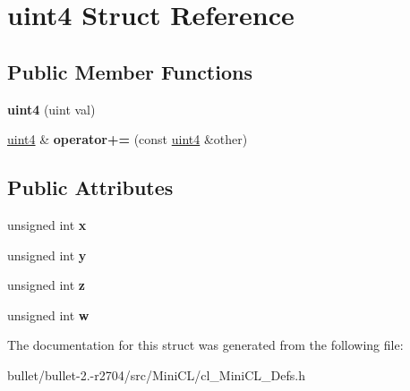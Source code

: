 \hypertarget{structuint4}{\section{uint4 Struct Reference}
\label{structuint4}
}
\subsection*{Public Member Functions}
\begin{DoxyCompactItemize}
\item 
\hypertarget{structuint4_a1804004744b3cc7230dba8c5d9082044}{{\bfseries uint4} (uint val)}\label{structuint4_a1804004744b3cc7230dba8c5d9082044}

\item 
\hypertarget{structuint4_a684ea0df820c3d948f6745d1760df90b}{\hyperlink{structuint4}{uint4} \& {\bfseries operator+=} (const \hyperlink{structuint4}{uint4} \&other)}\label{structuint4_a684ea0df820c3d948f6745d1760df90b}

\end{DoxyCompactItemize}
\subsection*{Public Attributes}
\begin{DoxyCompactItemize}
\item 
\hypertarget{structuint4_a8056d446b1dfa2c46affb607add6e552}{unsigned int {\bfseries x}}\label{structuint4_a8056d446b1dfa2c46affb607add6e552}

\item 
\hypertarget{structuint4_a06c291d608ef9f914432be529714df51}{unsigned int {\bfseries y}}\label{structuint4_a06c291d608ef9f914432be529714df51}

\item 
\hypertarget{structuint4_ade2ada07e7edf0b535cd3e7a40212373}{unsigned int {\bfseries z}}\label{structuint4_ade2ada07e7edf0b535cd3e7a40212373}

\item 
\hypertarget{structuint4_af15d584c473de1ca371f6655955fe256}{unsigned int {\bfseries w}}\label{structuint4_af15d584c473de1ca371f6655955fe256}

\end{DoxyCompactItemize}


The documentation for this struct was generated from the following file\+:\begin{DoxyCompactItemize}
\item 
bullet/bullet-\/2.-\/r2704/src/\+Mini\+C\+L/cl\+\_\+\+Mini\+C\+L\+\_\+\+Defs.\+h\end{DoxyCompactItemize}
